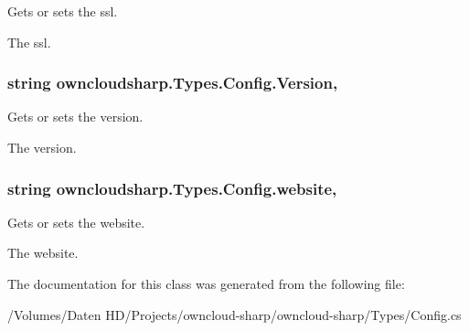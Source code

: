 Gets or sets the ssl. 

The ssl.\hypertarget{classowncloudsharp_1_1_types_1_1_config_af3fae6f952897261eeb927f2e0cae79f}{}
\subsubsection[{Version}]{\setlength{\rightskip}{0pt plus 5cm}string owncloudsharp.\+Types.\+Config.\+Version\hspace{0.3cm}{\ttfamily [get]}, {\ttfamily [set]}}\label{classowncloudsharp_1_1_types_1_1_config_af3fae6f952897261eeb927f2e0cae79f}


Gets or sets the version. 

The version.\hypertarget{classowncloudsharp_1_1_types_1_1_config_affdfbcb88e5cead0f1f4e693a2fc61b3}{}
\subsubsection[{website}]{\setlength{\rightskip}{0pt plus 5cm}string owncloudsharp.\+Types.\+Config.\+website\hspace{0.3cm}{\ttfamily [get]}, {\ttfamily [set]}}\label{classowncloudsharp_1_1_types_1_1_config_affdfbcb88e5cead0f1f4e693a2fc61b3}


Gets or sets the website. 

The website.

The documentation for this class was generated from the following file\+:\begin{DoxyCompactItemize}
\item 
/\+Volumes/\+Daten H\+D/\+Projects/owncloud-\/sharp/owncloud-\/sharp/\+Types/Config.\+cs\end{DoxyCompactItemize}
